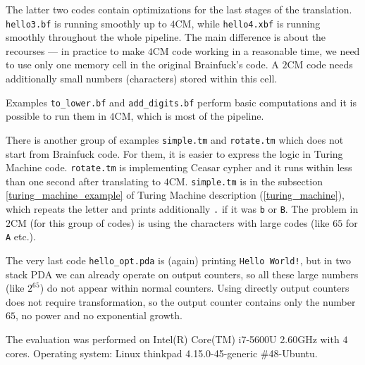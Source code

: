 \documentclass[english,shortabstract,mgr]{iithesis}
\begin{document}
The latter two codes contain optimizations for the last stages of the translation. \texttt{hello3.bf}
is running smoothly up to $4$CM, while \texttt{hello4.xbf} is running smoothly
throughout the whole pipeline. The main difference is about the recourses ---
in practice to make $4$CM code working in a reasonable time, we need to use only
one memory cell in the original Brainfuck's code.
A $2$CM code needs additionally small numbers (characters) stored within this cell.

Examples \texttt{to\_lower.bf} and \texttt{add\_digits.bf} perform basic
computations and it is possible to run them in $4$CM, which is most of the pipeline.

There is another group of examples \texttt{simple.tm} and \texttt{rotate.tm}
which does not start from Brainfuck code. For them, it is easier to express
the logic in Turing Machine code. \texttt{rotate.tm} is implementing Ceasar cypher
and it runs within less than one second after translating to $4$CM. \texttt{simple.tm}
is in the subsection \ref{turing_machine_example} of Turing Machine
description (\ref{turing_machine}), which repeats the letter and prints
additionally \texttt{.} if it was \texttt{b} or \texttt{B}.
The problem in $2$CM (for this group of codes) is using the characters with
large codes (like $65$ for \texttt{A} etc.).

The very last code \texttt{hello\_opt.pda} is (again) printing
\texttt{Hello World!}, but in two stack PDA we can already operate on
output counters, so all these large numbers (like $2^{65}$) do not
appear within normal counters. Using directly output counters does not
require transformation, so the output counter contains only the number $65$,
no power and no exponential growth.


The evaluation was performed on Intel(R) Core(TM) i7-5600U 2.60GHz
with $4$ cores. Operating system: Linux thinkpad 4.15.0-45-generic \#48-Ubuntu.
\end{document}
